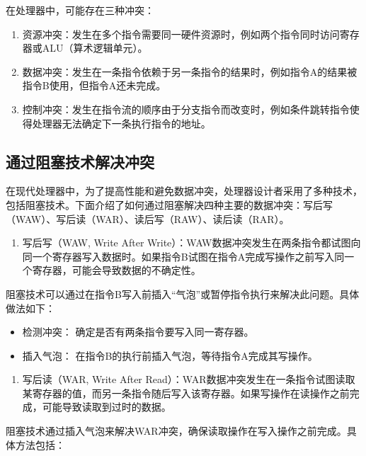 在处理器中，可能存在三种冲突：

\begin{enumerate}
\def\labelenumi{\arabic{enumi}.}
\item
  资源冲突：发生在多个指令需要同一硬件资源时，例如两个指令同时访问寄存器或ALU（算术逻辑单元）。
\item
  数据冲突：发生在一条指令依赖于另一条指令的结果时，例如指令A的结果被指令B使用，但指令A还未完成。
\item
  控制冲突：发生在指令流的顺序由于分支指令而改变时，例如条件跳转指令使得处理器无法确定下一条执行指令的地址。
\end{enumerate}

\subsection{通过阻塞技术解决冲突}\label{sec:05-simple-cpu-016}

在现代处理器中，为了提高性能和避免数据冲突，处理器设计者采用了多种技术，包括阻塞技术。下面介绍了如何通过阻塞解决四种主要的数据冲突：写后写（WAW）、写后读（WAR）、读后写（RAW）、读后读（RAR）。

\begin{enumerate}
\def\labelenumi{\arabic{enumi}.}
\tightlist
\item
  写后写（WAW, Write After Write）：WAW数据冲突发生在两条指令都试图向同一个寄存器写入数据时。如果指令B试图在指令A完成写操作之前写入同一个寄存器，可能会导致数据的不确定性。
\end{enumerate}

阻塞技术可以通过在指令B写入前插入``气泡''或暂停指令执行来解决此问题。具体做法如下：

\begin{itemize}
\item
  检测冲突： 确定是否有两条指令要写入同一寄存器。
\item
  插入气泡： 在指令B的执行前插入气泡，等待指令A完成其写操作。
\end{itemize}

\begin{enumerate}
\def\labelenumi{\arabic{enumi}.}
\setcounter{enumi}{1}
\tightlist
\item
  写后读（WAR, Write After Read）：WAR数据冲突发生在一条指令试图读取某寄存器的值，而另一条指令随后写入该寄存器。如果写操作在读操作之前完成，可能导致读取到过时的数据。
\end{enumerate}

阻塞技术通过插入气泡来解决WAR冲突，确保读取操作在写入操作之前完成。具体方法包括：

